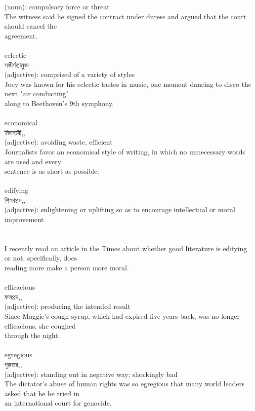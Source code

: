 \documentclass{article}
\begin{document}
{(noun): compulsory force or threat\\The witness said he signed the contract under duress and argued that the court should cancel the\\agreement.\\}\\
{eclectic}\\
{সঙ্কীর্ণতামুক্ত}\\
{(adjective): comprised of a variety of styles\\Joey was known for his eclectic tastes in music, one moment dancing to disco the next "air conducting"\\along to Beethoven's 9th symphony.\\}\\
{economical}\\
{মিতব্যয়ী,,}\\
{(adjective): avoiding waste, efficient\\Journalists favor an economical style of writing, in which no unnecessary words are used and every\\sentence is as short as possible.\\}\\
{edifying}\\
{শিক্ষাপ্রদ,,}\\
{(adjective): enlightening or uplifting so as to encourage intellectual or moral improvement\\\\                                                                               \\I recently read an article in the Times about whether good literature is edifying or not; specifically, does\\reading more make a person more moral.\\}\\
{efficacious}\\
{ফলপ্রদ,,}\\
{(adjective): producing the intended result\\Since Maggie's cough syrup, which had expired five years back, was no longer efficacious, she coughed\\through the night.\\}\\
{egregious}\\
{গুরুতর,,}\\
{(adjective): standing out in negative way; shockingly bad\\The dictator's abuse of human rights was so egregious that many world leaders asked that he be tried in\\an international court for genocide.\\}\\
\end{document}
